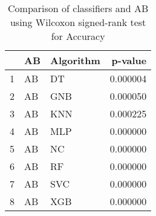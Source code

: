 \begin{table}
\footnotesize
\caption{Comparison of classifiers and AB using Wilcoxon signed-rank test for Accuracy}
\label{tab:AB wilcoxon Accuracy comparison}
\begin{tabular}{lllr}
\hline
 & AB & Algorithm & p-value \\
\hline
1 & AB & DT & 0.000004 \\
2 & AB & GNB & 0.000050 \\
3 & AB & KNN & 0.000225 \\
4 & AB & MLP & 0.000000 \\
5 & AB & NC & 0.000000 \\
6 & AB & RF & 0.000000 \\
7 & AB & SVC & 0.000000 \\
8 & AB & XGB & 0.000000 \\
\hline
\end{tabular}
\end{table}
